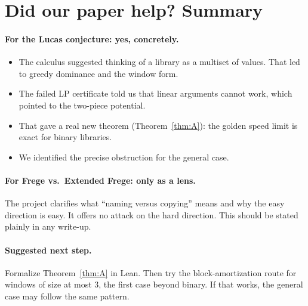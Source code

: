 \documentclass[11pt]{article}
\theoremstyle{remark}
\begin{document}
\section{Did our paper help? Summary}

\paragraph{For the Lucas conjecture: yes, concretely.}
\begin{itemize}
\item The calculus suggested thinking of a library as a multiset of values. That led to
  greedy dominance and the window form.
\item The failed LP certificate told us that linear arguments cannot work, which pointed
  to the two-piece potential.
\item That gave a real new theorem (Theorem~\ref{thm:A}): the golden speed limit is exact
  for binary libraries.
\item We identified the precise obstruction for the general case.
\end{itemize}

\paragraph{For Frege vs.\ Extended Frege: only as a lens.} The project clarifies what
``naming versus copying'' means and why the easy direction is easy. It offers no attack on
the hard direction. This should be stated plainly in any write-up.

\paragraph{Suggested next step.} Formalize Theorem~\ref{thm:A} in Lean. Then try the
block-amortization route for windows of size at most $3$, the first case beyond binary. If
that works, the general case may follow the same pattern.
\end{document}
